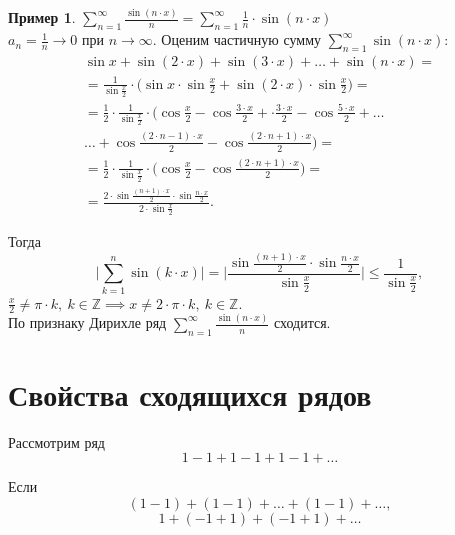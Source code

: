 \documentclass{report}
\theoremstyle{definition}
\newtheorem{example}{Пример}
\begin{document}
\begin{example}
  $\sum_{n=1}^{\infty} \frac{\sin (n\cdot x)}{n} = \sum_{n=1}^{\infty} \frac{1}{n} \cdot \sin (n\cdot x)$ \\

  $a_n = \frac{1}{n}\rightarrow 0$ при $n\rightarrow\infty$. Оценим частичную сумму $\sum_{n=1}^{\infty}\sin (n\cdot x)$:
  \begin{multline*}
    \sin x + \sin (2\cdot x) + \sin (3\cdot x) + \ldots + \sin (n\cdot x) = \\
    = \frac{1}{\sin \frac{x}{2}} \cdot \bigg(\sin x \cdot \sin \frac{x}{2} + \sin (2\cdot x) \cdot \sin\frac{x}{2}\bigg) = \\
    = \frac{1}{2} \cdot \frac{1}{\sin\frac{x}{2}} \cdot \bigg(\cos \frac{x}{2} - \cos \frac{3\cdot x}{2} + \cdot \frac{3\cdot x}{2} - \cos \frac{5\cdot x}{2} + \ldots \\
    \ldots + \cos \frac{(2\cdot n-1)\cdot x}{2} - \cos \frac{(2\cdot n+1) \cdot x}{2}\bigg) = \\
    = \frac{1}{2} \cdot \frac{1}{\sin \frac{x}{2}} \cdot \bigg(\cos \frac{x}{2} - \cos \frac{(2\cdot n + 1) \cdot x}{2}\bigg) = \\
    = \frac{2\cdot \sin \frac{(n+1)\cdot x}{2} \cdot \sin \frac{n\cdot x}{2}}{2\cdot \sin \frac{x}{2}}.
  \end{multline*}

  Тогда
  \begin{equation*}
    \bigg|\sum_{k=1}^{n} \sin (k\cdot x)\bigg| = \bigg|\frac{\sin\frac{(n+1)\cdot x}{2}\cdot \sin \frac{n \cdot x}{2}}{\sin \frac{x}{2}}\bigg| \leqslant \frac{1}{\sin\frac{x}{2}},
  \end{equation*}
  $\frac{x}{2} \ne \pi \cdot k, \ k \in \mathbb{Z} \implies x \ne 2 \cdot \pi \cdot k, \ k \in \mathbb{Z}$. \\

  По признаку Дирихле ряд $\sum_{n=1}^{\infty}\frac{\sin (n\cdot x)}{n}$ сходится.
\end{example}

\section{Свойства сходящихся рядов}

Рассмотрим ряд
\begin{equation*}
  1-1+1-1+1-1+\ldots
\end{equation*}

Если
\begin{equation*}
  (1-1) + (1-1) + \ldots + (1-1) + \ldots,
\end{equation*}
\begin{equation*}
  1 + (-1 + 1) + (-1 + 1) + \ldots
\end{equation*}
\end{document}
